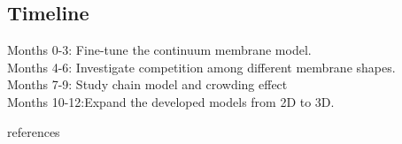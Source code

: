\documentclass[12pt]{article}
\begin{document}
\begin{flushleft}
\subsection*{Timeline}
Months 0-3: Fine-tune the continuum membrane model.\\
Months 4-6: Investigate competition among different membrane shapes.\\
Months 7-9: Study chain model and crowding effect\\
Months 10-12:Expand the developed models from 2D to 3D.



\end{flushleft}


\newpage




 {references}  
\end{document}

